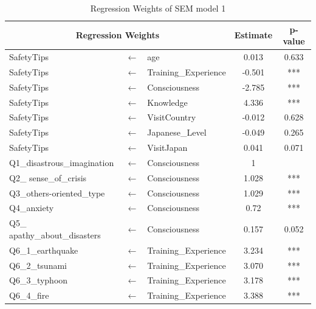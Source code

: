 \begin{table}[h]
  \caption{Regression Weights of SEM model 1 }
  \label{table9}
  \centering
  \begin{tabular}{lcl|c|c}
 \hline
 \multicolumn{3}{c|}{Regression Weights} & Estimate & p-value \\
 \hline
SafetyTips              &$\longleftarrow$ & age                  & 0.013  & 0.633                \\
SafetyTips              &$\longleftarrow$ & Training\_Experience & -0.501 & ***                  \\
SafetyTips              &$\longleftarrow$ & Consciousness        & -2.785 & ***                  \\
SafetyTips              &$\longleftarrow$ & Knowledge            & 4.336  & ***                  \\
SafetyTips              &$\longleftarrow$ & VisitCountry         & -0.012 & 0.628                \\
SafetyTips              &$\longleftarrow$ & Japanese\_Level      & -0.049 & 0.265                \\
SafetyTips              &$\longleftarrow$ & VisitJapan           & 0.041  & 0.071              \\
Q1\_disastrous\_imagination    &$\longleftarrow$ & Consciousness        & 1      &  \\
Q2\_ sense\_of\_crisis                      &$\longleftarrow$ & Consciousness        & 1.028  & ***                  \\
Q3\_others-oriented\_type                      &$\longleftarrow$ & Consciousness        & 1.029  & ***                  \\
Q4\_anxiety                      &$\longleftarrow$ & Consciousness        & 0.72   & ***                  \\
Q5\_ apathy\_about\_disasters                      &$\longleftarrow$ & Consciousness        & 0.157  & 0.052                \\
Q6\_1\_earthquake       &$\longleftarrow$ & Training\_Experience & 3.234  & ***                  \\
Q6\_2\_tsunami          &$\longleftarrow$ & Training\_Experience & 3.070   & ***                  \\
Q6\_3\_typhoon          &$\longleftarrow$ & Training\_Experience & 3.178  & ***                  \\
Q6\_4\_fire             &$\longleftarrow$ & Training\_Experience & 3.388  & ***                  \\

\end{tabular}
\end{table}
